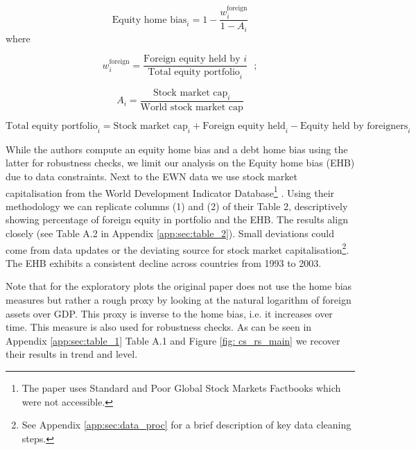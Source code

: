 \documentclass[11pt,a4paper]{article}
\begin{document}
\begin{equation}
  \text{Equity home bias}_i = 1 - \frac{w_i^{\text{foreign}}}{1 - A_i}
\end{equation}
where
\vspace{-0.5em}

\begin{minipage}[t]{0.48\linewidth}
  \begin{equation*}
    w_i^{\text{foreign}} = \frac{\text{Foreign equity held by } i}{\text{Total equity portfolio}_i} ~~~;
  \end{equation*}
\end{minipage}%
\hfill
\begin{minipage}[t]{0.48\linewidth}
  \begin{equation*}
    A_i = \frac{\text{Stock market cap}_i}{\text{World stock market cap}}
  \end{equation*}
\end{minipage}
\vspace{-0.5em}

\begin{equation*}
  \text{Total equity portfolio}_i = \text{Stock market cap}_i
    + \text{Foreign equity held}_i
    - \text{Equity held by foreigners}_i
\end{equation*}

While the authors compute an equity home bias and a debt home bias using the latter for robustness checks, we limit our analysis on the Equity home bias (EHB) due to data constraints. 
Next to the EWN data \parencite{lane2018external} we use stock market capitalisation from the World Development Indicator Database\footnote{The paper uses Standard and Poor Global Stock Markets Factbooks which were not accessible.} \parencite{WorldBank2026WDI}.
Using their methodology we can replicate columns (1) and (2) of their Table 2, descriptively showing percentage of foreign equity in portfolio and the EHB. The results align closely (see Table A.2 in Appendix \ref{app:sec:table_2}). 
Small deviations could come from data updates or the deviating source for stock market capitalisation\footnote{See Appendix \ref{app:sec:data_proc} for a brief description of key data cleaning steps.}. The EHB exhibits a consistent decline across countries from 1993 to 2003. 

Note that for the exploratory plots the original paper does not use the home bias measures but rather a rough proxy by looking at the natural logarithm of foreign assets over GDP. This proxy is inverse to the home bias, i.e. it increases over time. This measure is also used for robustness checks. 
As can be seen in Appendix \ref{app:sec:table_1} Table A.1 and Figure \ref{fig: cs_rs_main} we recover their results in trend and level.
\end{document}

